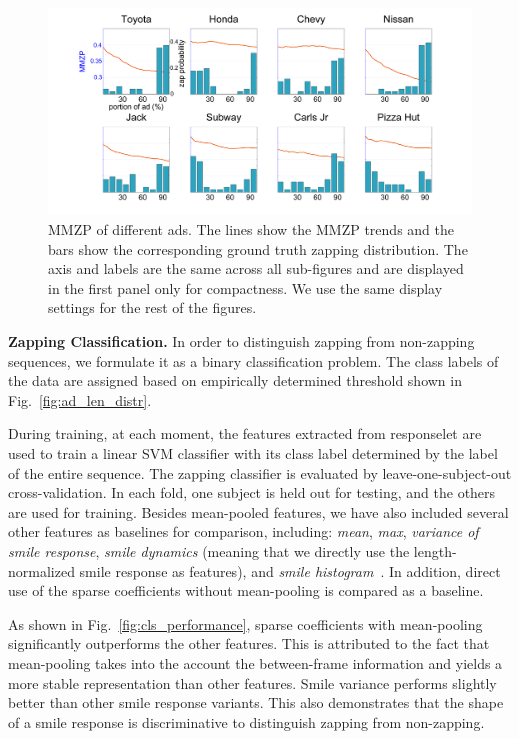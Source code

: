 \documentclass[twoside,leqno,twocolumn]{article}
\begin{document}
\begin{figure}[t]
	\centering
		\includegraphics[width=.8\textwidth]{fig/ad.png}
	\caption{MMZP of different ads. The lines show the MMZP trends and the bars show the corresponding ground truth zapping distribution. The axis and labels are the same across all sub-figures and are displayed in the first panel only for compactness. We use the same display settings for the rest of the figures.}
	\label{fig:ad}
\end{figure}

\noindent \textbf{Zapping Classification.}
In order to distinguish zapping from non-zapping sequences, we formulate it as a binary classification problem. The class labels of the data are assigned based on empirically determined threshold shown in Fig.~\ref{fig:ad_len_distr}.

During training, at each moment, the features extracted from responselet are used to train a linear SVM classifier with its class label determined by the label of the entire sequence. The zapping classifier is evaluated by leave-one-subject-out cross-validation. In each fold, one subject is held out for testing, and the others are used for training. Besides mean-pooled features, we have also included several other features as baselines for comparison, including: \textit{mean}, \textit{max}, \textit{variance of smile response}, \textit{smile dynamics} (meaning that we directly use the length-normalized smile response as features), and \textit{smile histogram}~\cite{Yang_TAC14}. In addition, direct use of the sparse coefficients without mean-pooling is compared as a baseline. 

As shown in Fig.~\ref{fig:cls_performance}, sparse coefficients with mean-pooling significantly outperforms the other features. This is attributed to the fact that mean-pooling takes into the account the between-frame information and yields a more stable representation than other features. Smile variance performs slightly better than other smile response variants. This also demonstrates that the shape of a smile response is discriminative to distinguish zapping from non-zapping. 
\end{document}

